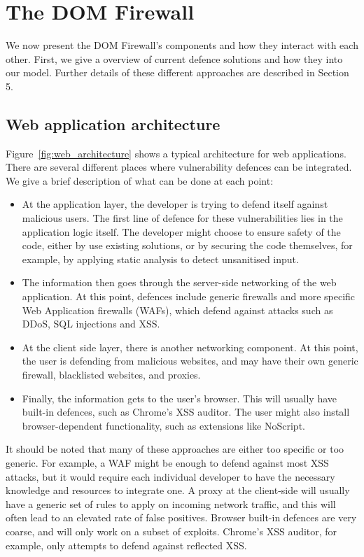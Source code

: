 \section{The DOM Firewall}

We now present the DOM Firewall's components and how they interact with each other. First, we give a overview of current defence solutions and how they into our model. Further details of these different approaches are described in Section 5.

\subsection{Web application architecture}
Figure~\ref{fig:web_architecture} shows a typical architecture for web applications. There are several different places where vulnerability defences can be integrated. We give a brief description of what can be done at each point:
\begin{itemize}
	\item  At the application layer, the developer is trying to defend itself against malicious users. The first line of defence for these vulnerabilities lies in the application logic itself. The developer might choose to ensure safety of the code, either by use existing solutions, or by securing the code themselves, for example, by applying static analysis to detect unsanitised input.
	\item The information then goes through the server-side networking of the web application. At this point, defences include generic firewalls and more specific Web Application firewalls (WAFs), which defend against  attacks such as DDoS, SQL injections and XSS.
	\item At the client side layer, there is another networking component. At this point, the user is defending from malicious websites, and may have their own generic firewall, blacklisted websites, and proxies. 
	\item Finally, the information gets to the user's browser. This will usually have built-in defences, such as Chrome's XSS auditor. The user might also install browser-dependent functionality, such as extensions like NoScript.
\end{itemize}

It should be noted that many of these approaches are either too specific or too generic. For example, a WAF might be enough to defend against most XSS attacks, but it would require each individual developer to have the necessary knowledge and resources to integrate one. A proxy at the client-side will usually have a generic set of rules to apply on incoming network traffic, and this will often lead to an elevated rate of false positives. Browser built-in defences are very coarse, and will only work on a subset of exploits. Chrome's XSS auditor, for example, only attempts to defend against reflected XSS. 

